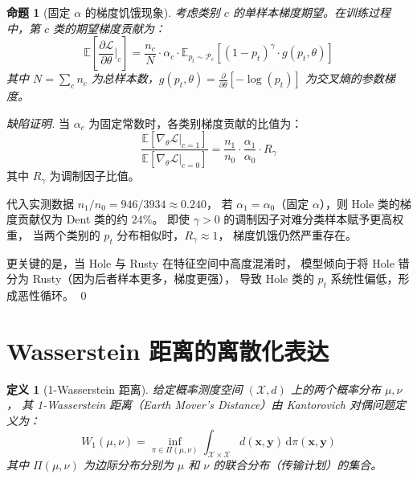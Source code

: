 \documentclass[12pt, a4paper]{ctexart}
\newtheorem{definition}{定义}[section]
\newtheorem{proposition}{命题}[section]
\begin{document}
\begin{proposition}[固定 $\alpha$ 的梯度饥饿现象]
\label{prop:gradient_starvation}
考虑类别 $c$ 的单样本梯度期望。在训练过程中，第 $c$ 类的期望梯度贡献为：
\begin{equation}
    \mathbb{E}\left[\frac{\partial \mathcal{L}}{\partial \theta}\bigg|_{c}\right]
    = \frac{n_c}{N} \cdot \alpha_c \cdot \mathbb{E}_{p_t \sim \mathcal{P}_c}
    \left[(1 - p_t)^{\gamma} \cdot g(p_t, \theta)\right]
    \label{eq:expected_gradient}
\end{equation}
其中 $N = \sum_{c} n_c$ 为总样本数，$g(p_t, \theta) = \frac{\partial}{\partial \theta}[-\log(p_t)]$
为交叉熵的参数梯度。
\end{proposition}

\begin{proof}[缺陷证明]
当 $\alpha_c$ 为固定常数时，各类别梯度贡献的比值为：
\begin{equation}
    \frac{\mathbb{E}[\nabla_\theta \mathcal{L}|_{c=1}]}
         {\mathbb{E}[\nabla_\theta \mathcal{L}|_{c=0}]}
    = \frac{n_1}{n_0} \cdot \frac{\alpha_1}{\alpha_0} \cdot R_{\gamma}
\end{equation}
其中 $R_{\gamma}$ 为调制因子比值。

代入实测数据 $n_1 / n_0 = 946 / 3934 \approx 0.240$，
若 $\alpha_1 = \alpha_0$（固定 $\alpha$），则 Hole 类的梯度贡献仅为 Dent 类的约 $24\%$。
即使 $\gamma > 0$ 的调制因子对难分类样本赋予更高权重，
当两个类别的 $p_t$ 分布相似时，$R_{\gamma} \approx 1$，
梯度饥饿仍然严重存在。

更关键的是，当 Hole 与 Rusty 在特征空间中高度混淆时，
模型倾向于将 Hole 错分为 Rusty（因为后者样本更多，梯度更强），
导致 Hole 类的 $p_t$ 系统性偏低，形成恶性循环。 \qed
\end{proof}

\section{Wasserstein 距离的离散化表达}

\begin{definition}[1-Wasserstein 距离]
给定概率测度空间 $(\mathcal{X}, d)$ 上的两个概率分布 $\mu, \nu$，
其 1-Wasserstein 距离（Earth Mover's Distance）由 Kantorovich 对偶问题定义为：
\begin{equation}
    W_1(\mu, \nu) = \inf_{\pi \in \Pi(\mu, \nu)}
    \int_{\mathcal{X} \times \mathcal{X}} d(\bm{x}, \bm{y}) \, \mathrm{d}\pi(\bm{x}, \bm{y})
    \label{eq:wasserstein_def}
\end{equation}
其中 $\Pi(\mu, \nu)$ 为边际分布分别为 $\mu$ 和 $\nu$ 的联合分布（传输计划）的集合。
\end{definition}
\end{document}
